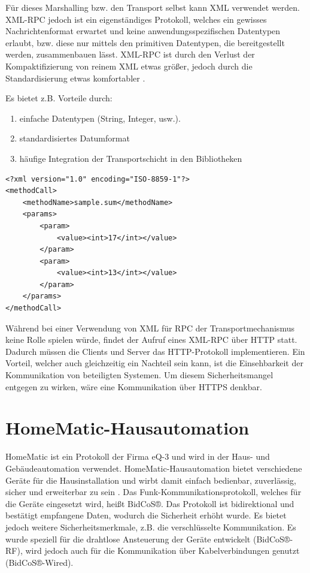 Für dieses Marshalling bzw. den Transport selbst kann XML verwendet werden.
XML-RPC jedoch ist ein eigenständiges Protokoll, welches ein gewisses Nachrichtenformat erwartet und keine
anwendungsspezifischen Datentypen erlaubt, bzw. diese nur mittels den primitiven Datentypen, die bereitgestellt werden,
zusammenbauen lässt.
XML-RPC ist durch den Verlust der Kompaktifizierung von reinem XML etwas größer, jedoch durch die Standardisierung
etwas komfortabler \cite{xmlrpc_so}.

Es bietet z.B. Vorteile durch:
\begin{enumerate}
\item einfache Datentypen (String, Integer, usw.).
\item standardisiertes Datumformat
\item häufige Integration der Transportschicht in den Bibliotheken
\end{enumerate}

\lstset{language=XML}
\begin{lstlisting}[frame=single,caption={Aufbau einer XML-RPC-Nachricht}]
<?xml version="1.0" encoding="ISO-8859-1"?>
<methodCall>
	<methodName>sample.sum</methodName>
	<params>
		<param>
			<value><int>17</int></value>
		</param>
		<param>
			<value><int>13</int></value>
		</param>
	</params>
</methodCall>
\end{lstlisting}

Während bei einer Verwendung von XML für RPC der Transportmechanismus keine Rolle spielen würde, findet
der Aufruf eines XML-RPC über HTTP statt.
Dadurch müssen die Clients und Server das HTTP-Protokoll implementieren.
Ein Vorteil, welcher auch gleichzeitig ein Nachteil sein kann, ist die Einsehbarkeit der Kommunikation
von beteiligten Systemen.
Um diesem Sicherheitsmangel entgegen zu wirken, wäre eine Kommunikation über HTTPS denkbar.

\section{HomeMatic-Hausautomation}
\label{gru_hm_ha}

HomeMatic ist ein Protokoll der Firma eQ-3 und wird in der Haus- und Gebäudeautomation
verwendet.
HomeMatic-Hausautomation bietet verschiedene Geräte für die Hausinstallation und wirbt damit einfach bedienbar,
zuverlässig, sicher und erweiterbar zu sein \cite{homematic_eq3}.
Das Funk-Kommunikationsprotokoll, welches für die Geräte eingesetzt wird, heißt BidCoS®.
Das Protokoll ist bidirektional und bestätigt empfangene Daten, wodurch die Sicherheit
erhöht wurde.
Es bietet jedoch weitere Sicherheitsmerkmale, z.B. die verschlüsselte Kommunikation.
Es wurde speziell für die drahtlose Ansteuerung der Geräte entwickelt \cite{homematic_eq3_faq} (BidCoS®-RF),
wird jedoch auch für die Kommunikation über Kabelverbindungen genutzt (BidCoS®-Wired).

